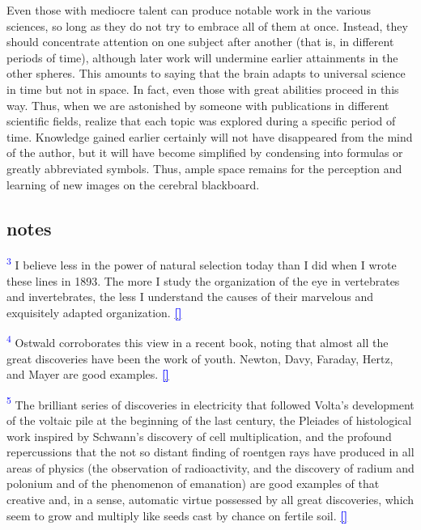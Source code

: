 \documentclass{article}
\newcommand{\notetext}[2]{
 \par\noindent
 \hypertarget{note:#1}{\textsuperscript{\textcolor{blue}{#1}}} #2
 \hyperlink{ref:#1}{\textcolor{blue}{\textbf{[\textuparrow]}}}
 \par\vspace{1em}
}
\begin{document}
Even those with mediocre talent can produce notable work in the various sciences, so long as they do not try to embrace all of them at once. Instead, they should concentrate attention on one subject after another (that is, in different periods of time), although later work will undermine earlier attainments in the other spheres. This amounts to saying that the brain adapts to universal science in time but not in space. In fact, even those with great abilities proceed in this way. Thus, when we are astonished by someone with publications in different scientific fields, realize that each topic was explored during a specific period of time. Knowledge gained earlier certainly will not have disappeared from the mind of the author, but it will have become simplified by condensing into formulas or greatly abbreviated symbols. Thus, ample space remains for the perception and learning of new images on the cerebral blackboard.

\subsection*{notes}

\notetext{3}{I believe less in the power of natural selection today than I did when I wrote these lines in 1893. The more I study the organization of the eye in vertebrates and invertebrates, the less I understand the causes of their marvelous and exquisitely adapted organization.}

\notetext{4}{ Ostwald corroborates this view in a recent book, noting that almost all the great discoveries have been the work of youth. Newton, Davy, Faraday, Hertz, and Mayer are good examples.}

\notetext{5}{The brilliant series of discoveries in electricity that followed Volta’s development of the voltaic pile at the beginning of the last century, the Pleiades of histological work inspired by Schwann’s discovery of cell multiplication, and the profound repercussions that the not so distant finding of roentgen rays have produced in all areas of physics (the observation of radioactivity, and the discovery of radium and polonium and of the phenomenon of emanation) are good examples of that creative and, in a sense, automatic virtue possessed by all great discoveries, which seem to grow and multiply like seeds cast by chance on fertile soil.}
\end{document}
